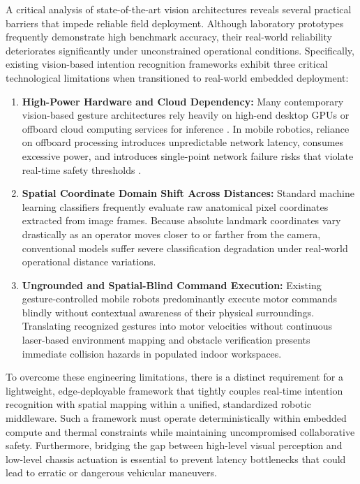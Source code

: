 A critical analysis of state-of-the-art vision architectures reveals several practical barriers that impede reliable field deployment. Although laboratory prototypes frequently demonstrate high benchmark accuracy, their real-world reliability deteriorates significantly under unconstrained operational conditions. Specifically, existing vision-based intention recognition frameworks exhibit three critical technological limitations when transitioned to real-world embedded deployment:
\begin{enumerate}
    \item \textbf{High-Power Hardware and Cloud Dependency:} Many contemporary vision-based gesture architectures rely heavily on high-end desktop GPUs or offboard cloud computing services for inference \cite{mahmud2022}. In mobile robotics, reliance on offboard processing introduces unpredictable network latency, consumes excessive power, and introduces single-point network failure risks that violate real-time safety thresholds \cite{tsitos2022}.
    \item \textbf{Spatial Coordinate Domain Shift Across Distances:} Standard machine learning classifiers frequently evaluate raw anatomical pixel coordinates extracted from image frames. Because absolute landmark coordinates vary drastically as an operator moves closer to or farther from the camera, conventional models suffer severe classification degradation under real-world operational distance variations.
    \item \textbf{Ungrounded and Spatial-Blind Command Execution:} Existing gesture-controlled mobile robots predominantly execute motor commands blindly without contextual awareness of their physical surroundings. Translating recognized gestures into motor velocities without continuous laser-based environment mapping and obstacle verification presents immediate collision hazards in populated indoor workspaces.
\end{enumerate}

To overcome these engineering limitations, there is a distinct requirement for a lightweight, edge-deployable framework that tightly couples real-time intention recognition with spatial mapping within a unified, standardized robotic middleware. Such a framework must operate deterministically within embedded compute and thermal constraints while maintaining uncompromised collaborative safety. Furthermore, bridging the gap between high-level visual perception and low-level chassis actuation is essential to prevent latency bottlenecks that could lead to erratic or dangerous vehicular maneuvers.

